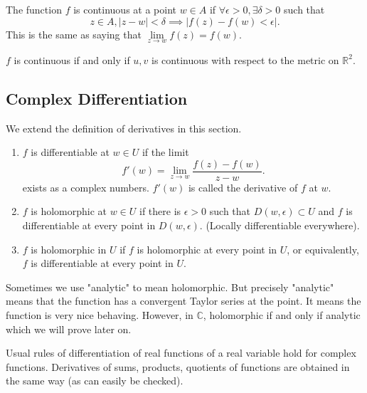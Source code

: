\begin{definition}
    The function \(f\) is continuous at a point \(w \in A\) if \(\forall \epsilon > 0, \exists \delta > 0\) such that
    \[
        z \in A, \left\vert z - w \right\vert <\delta \implies \left\vert f(z)-f(w) < \epsilon \right\vert.
    \]
    This is the same as saying that \(\lim\limits_{z \to w} f(z)=f(w)\).
\end{definition}
\begin{remark}
    \(f\) is continuous if and only if \(u,v\) is continuous with respect to the metric on \(\mathbb{R}^2\).
\end{remark}

\subsection{Complex Differentiation}
We extend the definition of derivatives in this section.
\begin{definition}
    \begin{enumerate}
        We have below some definitions of differentiation in \(\mathbb{C}\) .
    \item \(f\)  is differentiable at \(w \in U\) if the limit
    \[
        f'(w)=\lim\limits_{z \to w}\frac{f(z)-f(w)}{z-w}.
    \]
    exists as a complex numbers. \(f'(w)\) is called the derivative of \(f\) at \(w\).
    \item \(f\) is holomorphic at \(w \in U\) if there is \(\epsilon>0\) such that \(D(w, \epsilon) \subset U\) and \(f\) is differentiable at every point in \(D(w, \epsilon)\). (Locally differentiable everywhere).
    \item \(f\)  is holomorphic in \(U\) if \(f\) is holomorphic at every point in \(U\), or equivalently, \(f\) is differentiable at every point in \(U\).
    \end{enumerate}
\end{definition}
\begin{remark}
    Sometimes we use "analytic" to mean holomorphic. But precisely "analytic" means that the function has a convergent Taylor series at the point. It means the function is very nice behaving. However, in \(\mathbb{C}\), holomorphic if and only if analytic which we will prove later on.
\end{remark}
Usual rules of differentiation of real functions of a real variable hold for complex functions. Derivatives of sums, products, quotients of functions are obtained in the same way (as can easily be checked).

